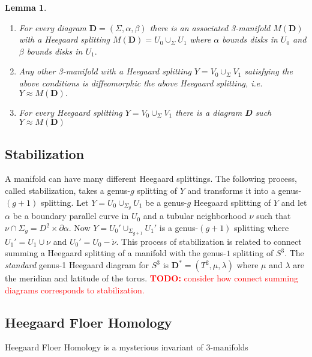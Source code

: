 \documentclass{amsart}
\def\todo#1{\textcolor{red}{\textbf{TODO: }{#1}}}
\newtheorem{lemma}[theorem]{Lemma}
\theoremstyle{definition}
\begin{document}
\begin{lemma}
\begin{enumerate}
\item For every diagram $\textbf{D} = (\Sigma, \alpha, \beta)$ there is an associated 3-manifold $M(\textbf{D})$ with a Heegaard splitting $M(\textbf{D}) = U_{0} \cup_{\Sigma} U_{1}$ where $\alpha$ bounds disks in $U_{0}$ and $\beta$ bounds disks in $U_{1}.$
\item Any other 3-manifold with a Heegaard splitting $Y = V_{0} \cup_{\Sigma} V_{1}$ satisfying the above conditions is diffeomorphic the above Heegaard splitting, i.e. $Y \approx M(\textbf{D}).$
\item  For every Heegaard splitting $Y = V_{0} \cup_{\Sigma} V_{1}$ there is a diagram \textbf{D} such $Y \approx M(\textbf{D})$
\end{enumerate}
\end{lemma}


\subsection{Stabilization}
A manifold can have many different Heegaard splittings. The following process, called stabilization, takes a genus-$g$ splitting of $Y$ and transforms it into a genus-$(g + 1)$ splitting. Let $Y = U_{0} \cup_{\Sigma_{g}} U_{1}$ be a genus-$g$ Heegaard splitting of $Y$ and let $\alpha$ be a boundary parallel curve in $U_{0}$ and a tubular neighborhood $\nu$ such that $\nu \cap \Sigma_{g} = D^{2} \times \partial \alpha.$ Now $Y = U_{0}' \cup_{\Sigma_{g + 1}} U_{1}'$ is a genus-$(g+1)$ splitting where $U_{1}' = U_{1} \cup \nu$ and $U_{0}' = U_{0} - \mathring{\nu}.$ \newline \newline This process of stabilization is related to connect summing a  Heegaard splitting of a manifold with the genus-$1$ splitting of $S^{3}.$  The \textit{standard} genus-1 Heegaard diagram for $S^{3}$ is $\textbf{D}^{*} = (T^{2}, \mu, \lambda)$ where        $\mu$ and $\lambda$ are the meridian and latitude of the torus. \todo{consider how connect summing diagrams corresponds to stabilization.}

\subsection{Heegaard Floer Homology}
Heegaard Floer Homology is a mysterious invariant of 3-manifolds
\end{document}
